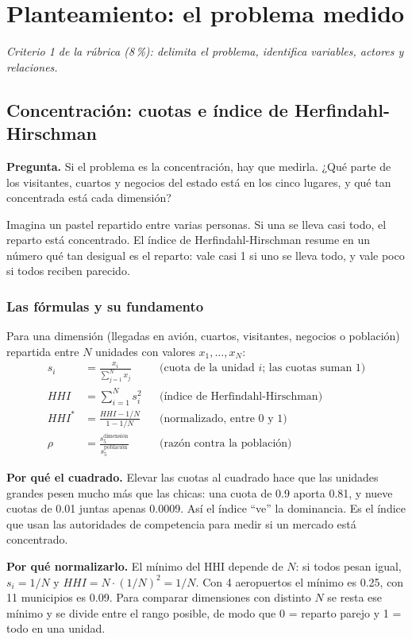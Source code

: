 \chapter{Planteamiento: el problema medido}
\label{cap:planteamiento}
\textit{Criterio 1 de la rúbrica (8\,\%): delimita el problema, identifica variables, actores y relaciones.}

\section{Concentración: cuotas e índice de Herfindahl-Hirschman}
\textbf{Pregunta.} Si el problema es la concentración, hay que medirla. ¿Qué parte de los visitantes, cuartos y negocios
del estado está en los cinco lugares, y qué tan concentrada está cada dimensión?

\begin{intuicion}
Imagina un pastel repartido entre varias personas. Si una se lleva casi todo, el reparto está concentrado. El índice de
Herfindahl-Hirschman resume en un número qué tan desigual es el reparto: vale casi 1 si uno se lleva todo, y vale poco si
todos reciben parecido.
\end{intuicion}

\subsection{Las fórmulas y su fundamento}
Para una dimensión (llegadas en avión, cuartos, visitantes, negocios o población) repartida entre $N$ unidades con
valores $x_1,\dots,x_N$:
\begin{align*}
s_i &= \frac{x_i}{\sum_{j=1}^{N} x_j} &&\text{(cuota de la unidad $i$; las cuotas suman 1)}\\
HHI &= \sum_{i=1}^{N} s_i^2 &&\text{(índice de Herfindahl-Hirschman)}\\
HHI^{*} &= \frac{HHI-1/N}{1-1/N} &&\text{(normalizado, entre 0 y 1)}\\
\rho &= \frac{s_5^{\text{dimensión}}}{s_5^{\text{población}}} &&\text{(razón contra la población)}
\end{align*}

\textbf{Por qué el cuadrado.} Elevar las cuotas al cuadrado hace que las unidades grandes pesen mucho más que las chicas:
una cuota de 0.9 aporta 0.81, y nueve cuotas de 0.01 juntas apenas 0.0009. Así el índice ``ve'' la dominancia. Es el
índice que usan las autoridades de competencia para medir si un mercado está concentrado.

\textbf{Por qué normalizarlo.} El mínimo del HHI depende de $N$: si todos pesan igual, $s_i=1/N$ y
$HHI=N\cdot(1/N)^2=1/N$. Con 4 aeropuertos el mínimo es 0.25, con 11 municipios es 0.09. Para comparar dimensiones con
distinto $N$ se resta ese mínimo y se divide entre el rango posible, de modo que 0 = reparto parejo y 1 = todo en una
unidad.

